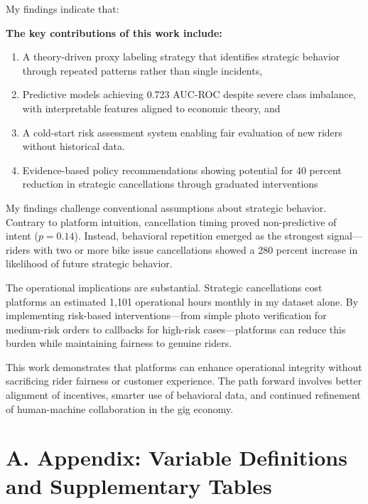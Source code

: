 \documentclass[12pt,letterpaper]{article}
\begin{document}
My findings indicate that:

\textbf{The key contributions of this work include:}
\begin{enumerate}
    \item A theory-driven proxy labeling strategy that identifies strategic behavior through repeated patterns rather than single incidents,
    \item Predictive models achieving 0.723 AUC-ROC despite severe class imbalance, with interpretable features aligned to economic theory, and
    \item A cold-start risk assessment system enabling fair evaluation of new riders without historical data.
\end{enumerate}
\begin{enumerate}
    \setcounter{enumi}{3} %
    \item Evidence-based policy recommendations showing potential for 40 percent reduction in strategic cancellations through graduated interventions
\end{enumerate}

My findings challenge conventional assumptions about strategic behavior. Contrary to platform intuition, cancellation timing proved non-predictive of intent ($p = 0.14$). Instead, behavioral repetition emerged as the strongest signal—riders with two or more bike issue cancellations showed a 280 percent increase in likelihood of future strategic behavior.

The operational implications are substantial. Strategic cancellations cost platforms an estimated 1,101 operational hours monthly in my dataset alone. By implementing risk-based interventions—from simple photo verification for medium-risk orders to callbacks for high-risk cases—platforms can reduce this burden while maintaining fairness to genuine riders.

This work demonstrates that platforms can enhance operational integrity without sacrificing rider fairness or customer experience. The path forward involves better alignment of incentives, smarter use of behavioral data, and continued refinement of human-machine collaboration in the gig economy.

\appendix

\section*{A. Appendix: Variable Definitions and Supplementary Tables}
\end{document}

